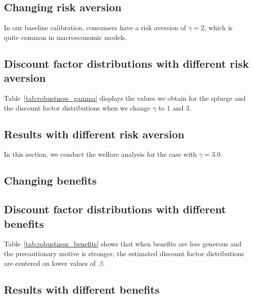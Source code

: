 \documentclass[\latexroot/\projectname]{subfiles}
\begin{document}
\FloatBarrier
\hypertarget{changing-risk-aversion}{}\par\subsection*{Changing risk aversion}
\whenintegrated{\label{sec:robust_gamma}} %

In our baseline calibration, consumers have a risk aversion of $\gamma=2$, which is quite common in macroeconomic models.

\subsection*{Discount factor distributions with different risk aversion}
\whenintegrated{\label{sec:robust_gamma_estim}} %

Table~\ref{tab:robustness_gamma} displays the values we obtain for the splurge and the discount factor distributions when we change $\gamma$ to $1$ and $3$.

\subsection*{Results with different risk aversion}
\whenintegrated{\label{sec:robust_gamma_results}} %

In this section, we conduct the welfare analysis for the case with $\gamma=3.0$.
\hypertarget{changing-benefits}{}\subsection*{Changing benefits}
\whenintegrated{\label{sec:robust_benefits}} %



\subsection*{Discount factor distributions with different benefits}
\whenintegrated{\label{sec:robust_benefits_estim}} %

Table~\ref{tab:robustness_benefits} shows that when benefits are less generous and the precautionary motive is stronger, the estimated discount factor distributions are centered on lower values of~$\beta$.

\FloatBarrier
\subsection*{Results with different benefits}
\whenintegrated{\label{sec:robust_benefits_results}} %
\end{document}
